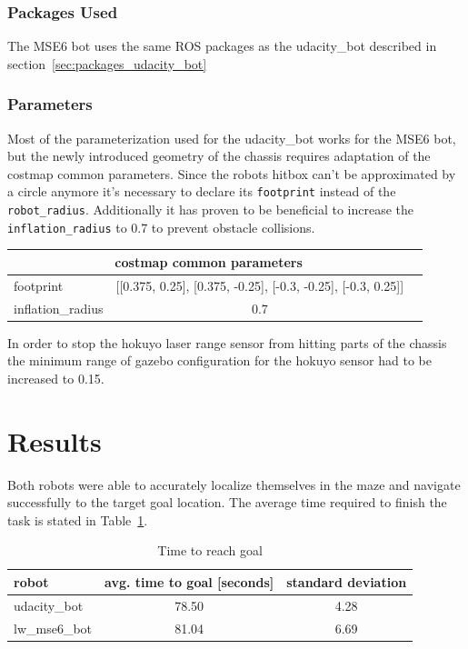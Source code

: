 \documentclass[10pt,journal,compsoc]{IEEEtran}
\begin{document}
\subsubsection{Packages Used}
The MSE6 bot uses the same ROS packages as the udacity\_bot described in section~\ref{sec:packages_udacity_bot}

\subsubsection{Parameters}
Most of the parameterization used for the udacity\_bot works for the MSE6 bot, but the newly introduced geometry of the chassis requires adaptation of the costmap common parameters.
Since the robots hitbox can't be approximated by a circle anymore it's necessary to declare its \texttt{footprint} instead of the \texttt{robot\_radius}.
Additionally it has proven to be beneficial to increase the \texttt{inflation\_radius} to 0.7 to prevent obstacle collisions.
\begin{table}[h]
      \begin{center}
            \begin{tabular}{|l|c|c|} 
      \multicolumn{2}{c}{costmap common parameters} \\ \hline
      footprint & [[0.375, 0.25], [0.375, -0.25], [-0.3, -0.25], [-0.3, 0.25]] \\ \hline
      inflation\_radius & 0.7 \\ \hline
\end{tabular}
\end{center}
\end{table}


In order to stop the hokuyo laser range sensor from hitting parts of the chassis the minimum range of gazebo configuration for the hokuyo sensor had to be increased to 0.15.

\section{Results}

Both robots were able to accurately localize themselves in the maze and navigate successfully to the target goal location. 
The average time required to finish the task is stated in Table~\ref{tab:navigation_performance}.

\begin{table}[h]
      \caption{Time to reach goal}
      \label{tab:navigation_performance}
      \begin{center}
            \begin{tabular}{|l|c|c|} \hline
            robot & avg. time to goal [seconds] & standard deviation\\ \hline
            udacity\_bot & 78.50 & 4.28 \\ \hline
            lw\_mse6\_bot & 81.04 & 6.69\\ \hline
      \end{tabular}
\end{center}
\end{table}
\end{document}
